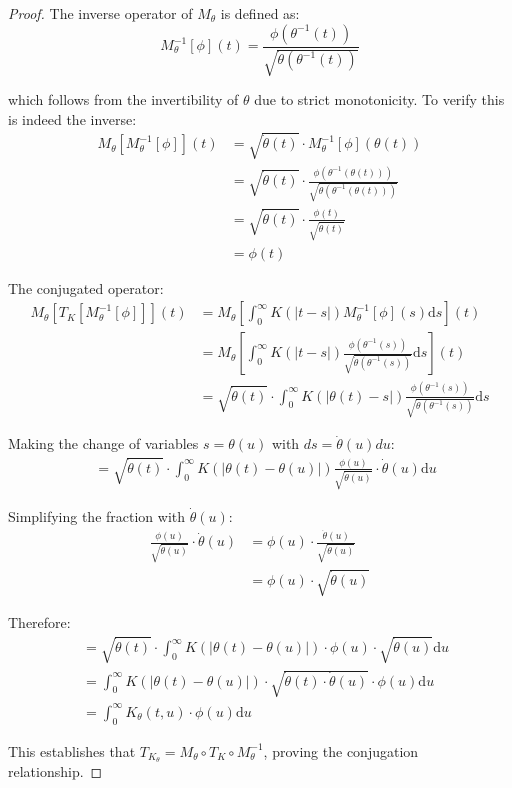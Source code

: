 \documentclass{article}
\newcommand{\dd}{\mathrm{d}}
\newcommand{\dottheta}{\dot{\theta}}
\begin{document}
\begin{proof}
The inverse operator of $M_\theta$ is defined as:
\begin{equation}
M_\theta^{-1}[\phi](t) = \frac{\phi(\theta^{-1}(t))}{\sqrt{\dottheta(\theta^{-1}(t))}}
\end{equation}

which follows from the invertibility of $\theta$ due to strict monotonicity. To verify this is indeed the inverse:
\begin{align}
M_\theta[M_\theta^{-1}[\phi]](t) &= \sqrt{\dottheta(t)} \cdot M_\theta^{-1}[\phi](\theta(t))\\
&= \sqrt{\dottheta(t)} \cdot \frac{\phi(\theta^{-1}(\theta(t)))}{\sqrt{\dottheta(\theta^{-1}(\theta(t)))}}\\
&= \sqrt{\dottheta(t)} \cdot \frac{\phi(t)}{\sqrt{\dottheta(t)}}\\
&= \phi(t)
\end{align}

The conjugated operator:
\begin{align}
M_\theta[T_K[M_\theta^{-1}[\phi]]](t) &= M_\theta[\int_0^\infty K(|t-s|)M_\theta^{-1}[\phi](s) \dd s](t)\\
&= M_\theta[\int_0^\infty K(|t-s|)\frac{\phi(\theta^{-1}(s))}{\sqrt{\dottheta(\theta^{-1}(s))}} \dd s](t)\\
&= \sqrt{\dottheta(t)} \cdot \int_0^\infty K(|\theta(t)-s|)\frac{\phi(\theta^{-1}(s))}{\sqrt{\dottheta(\theta^{-1}(s))}} \dd s
\end{align}

Making the change of variables $s = \theta(u)$ with $ds = \dottheta(u)du$:
\begin{align}
&= \sqrt{\dottheta(t)} \cdot \int_0^\infty K(|\theta(t)-\theta(u)|)\frac{\phi(u)}{\sqrt{\dottheta(u)}} \cdot \dottheta(u) \dd u
\end{align}

Simplifying the fraction with $\dottheta(u)$:
\begin{align}
\frac{\phi(u)}{\sqrt{\dottheta(u)}} \cdot \dottheta(u) &= \phi(u) \cdot \frac{\dottheta(u)}{\sqrt{\dottheta(u)}}\\
&= \phi(u) \cdot \sqrt{\dottheta(u)}
\end{align}

Therefore:
\begin{align}
&= \sqrt{\dottheta(t)} \cdot \int_0^\infty K(|\theta(t)-\theta(u)|) \cdot \phi(u) \cdot \sqrt{\dottheta(u)} \dd u\\
&= \int_0^\infty K(|\theta(t)-\theta(u)|) \cdot \sqrt{\dottheta(t) \cdot \dottheta(u)} \cdot \phi(u) \dd u\\
&= \int_0^\infty K_\theta(t,u) \cdot \phi(u) \dd u
\end{align}

This establishes that $T_{K_\theta} = M_\theta \circ T_K \circ M_\theta^{-1}$, proving the conjugation relationship.
\end{proof}
\end{document}
